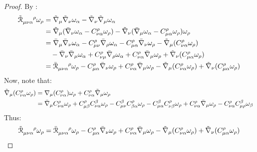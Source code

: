 \begin{proofbox}
  \begin{proof}
    By :
    \begin{equation*}
      \begin{split}
        \tensor{\tilde{\rr}}{_{\mu \nu \alpha}^\rho} \omega_\rho
        & = \tilde{\na}_\mu \tilde{\na}_\nu \omega_\alpha - \tilde{\na}_\nu \tilde{\na}_\mu \omega_\alpha \\
        & = \tilde{\na}_\mu ( \bar{\na}_\nu \omega_\alpha - C^\rho_{\nu \alpha} \omega_\rho ) - \tilde{\na}_\nu ( \bar{\na}_\mu \omega_\alpha - C^\rho_{\mu \alpha} \omega_\rho ) \omega_\rho \\
        & = \bar{\na}_\mu \bar{\na}_\nu \omega_\alpha - C^\rho_{\mu \nu} \bar{\na}_\rho \omega_\alpha - C^\rho_{\mu \alpha} \bar{\na}_\nu \omega_\rho - \tilde{\na}_\mu (C^\rho_{\nu \alpha} \omega_\rho) \\
        & \quad - \bar{\na}_\nu \bar{\na}_\mu \omega_\alpha + C^\rho_{\nu \mu} \bar{\na}_\rho \omega_\alpha + C^\rho_{\nu \alpha} \bar{\na}_\mu \omega_\rho + \tilde{\na}_\nu (C^\rho_{\mu \alpha} \omega_\rho) \\
        & = \tensor{\bar{\rr}}{_{\mu \nu \alpha}^\rho} \omega_\rho - C^\rho_{\mu \alpha} \bar{\na}_\nu \omega_\rho + C^\rho_{\nu \alpha} \bar{\na}_\mu \omega_\rho - \tilde{\na}_\mu (C^\rho_{\nu \alpha} \omega_\rho) + \tilde{\na}_\nu (C^\rho_{\mu \alpha} \omega_\rho)
      \end{split}
    \end{equation*}
    Now, note that:
    \begin{equation*}
      \begin{split}
        \tilde{\nabla}_\mu (C^\rho_{\nu \alpha} \omega_\rho)
        & = \nabla_\mu (C^\rho_{\nu \alpha}) \omega_\rho + C^\rho_{\nu \alpha} \tilde{\nabla}_\mu \omega_\rho \\
        & = \bar{\nabla}_\mu C^\rho_{\nu \alpha} \omega_\rho + C^\rho_{\mu \beta} C^\beta_{\nu \alpha} \omega_\rho - C^\beta_{\mu \nu} C^\rho_{\beta \alpha} \omega_\rho - C^\beta_{\mu \alpha} C^\rho_{\nu \beta} \omega_\rho + C^\rho_{\nu \alpha} \bar{\nabla}_\mu \omega_\rho - C^\rho_{\nu \alpha} C^\beta_{\mu \rho} \omega_\beta
      \end{split}
    \end{equation*}
    Thus:
    \begin{equation*}
      \begin{split}
        \tensor{\tilde{\rr}}{_{\mu \nu \alpha}^\rho} \omega_\rho
        & = \tensor{\bar{\rr}}{_{\mu \nu \alpha}^\rho} \omega_\rho - C^\rho_{\mu \alpha} \bar{\na}_\nu \omega_\rho + C^\rho_{\nu \alpha} \bar{\na}_\mu \omega_\rho - \tilde{\na}_\mu (C^\rho_{\nu \alpha} \omega_\rho) + \tilde{\na}_\nu (C^\rho_{\mu \alpha} \omega_\rho) \\

\end{split}
\end{equation*}
\end{proof}
\end{proofbox}
